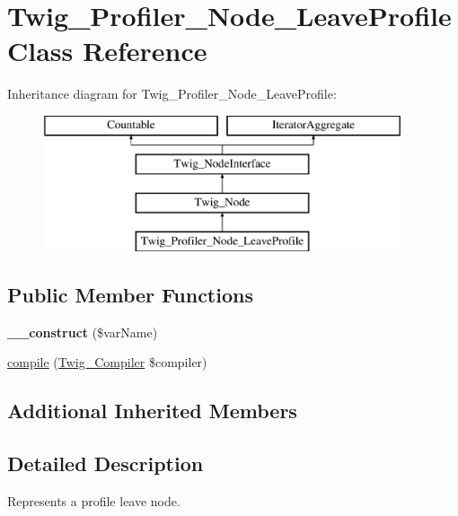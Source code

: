 \hypertarget{class_twig___profiler___node___leave_profile}{}\section{Twig\+\_\+\+Profiler\+\_\+\+Node\+\_\+\+Leave\+Profile Class Reference}
\label{class_twig___profiler___node___leave_profile}
Inheritance diagram for Twig\+\_\+\+Profiler\+\_\+\+Node\+\_\+\+Leave\+Profile\+:\begin{figure}[H]
\begin{center}
\leavevmode
\includegraphics[height=4.000000cm]{class_twig___profiler___node___leave_profile}
\end{center}
\end{figure}
\subsection*{Public Member Functions}
\begin{DoxyCompactItemize}
\item 
\hypertarget{class_twig___profiler___node___leave_profile_a388446705ebca778a4889b65a6c8ceb3}{}{\bfseries \+\_\+\+\_\+construct} (\$var\+Name)\label{class_twig___profiler___node___leave_profile_a388446705ebca778a4889b65a6c8ceb3}

\item 
\hyperlink{class_twig___profiler___node___leave_profile_a4e0faa87c3fae583620b84d3607085da}{compile} (\hyperlink{class_twig___compiler}{Twig\+\_\+\+Compiler} \$compiler)
\end{DoxyCompactItemize}
\subsection*{Additional Inherited Members}


\subsection{Detailed Description}
Represents a profile leave node.

